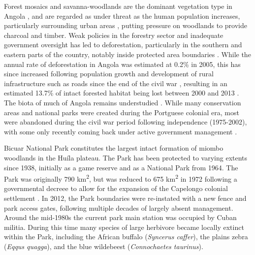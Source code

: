 \begin{refsection}
Forest mosaics and savanna-woodlands are the dominant vegetation type in Angola \citep{White1983}, and are regarded as under threat as the human population increases, particularly surrounding urban areas \citep{Ritchie2018}, putting pressure on woodlands to provide charcoal and timber. Weak policies in the forestry sector and inadequate government oversight has led to deforestation, particularly in the southern and eastern parts of the country, notably inside protected area boundaries \citep{FAO2015, Mendelsohn2019}. While the annual rate of deforestation in Angola was estimated at 0.2\% in 2005, this has since increased following population growth and development of rural infrastructure such as roads since the end of the civil war \citep{Roder2015}, resulting in an estimated 13.7\% of intact forested habitat being lost between 2000 and 2013 \citep{Potapov2017, Hansen2013}. The biota of much of Angola remains understudied \citep{Huntley2019}. While many conservation areas and national parks were created during the Portguese colonial era, most were abandoned during the civil war period following independence (1975-2002), with some only recently coming back under active government management \citep{Huntley2019, Ministerio2006}.

Bicuar National Park constitutes the largest intact formation of miombo woodlands in the Hu\'{i}la plateau. The Park has been protected to varying extents since 1938, initially as a game reserve and as a National Park from 1964. The Park was originally 790 km\textsuperscript{2}, but was reduced to \textapprox{}675 km\textsuperscript{2} in 1972 following a governmental decreee to allow for the expansion of the Capelongo colonial settlement \citep{Mendelsohn2019}. In 2012, the Park boundaries were re-instated with a new fence and park access gates, following multiple decades of largely absent management. Around the mid-1980s the current park main station was occupied by Cuban militia. During this time many species of large herbivore became locally extinct within the Park, including the African buffalo (\textit{Syncerus caffer}), the plains zebra (\textit{Eqqus quagga}), and the blue wildebeest (\textit{Connochaetes taurinus}).


\end{refsection}
